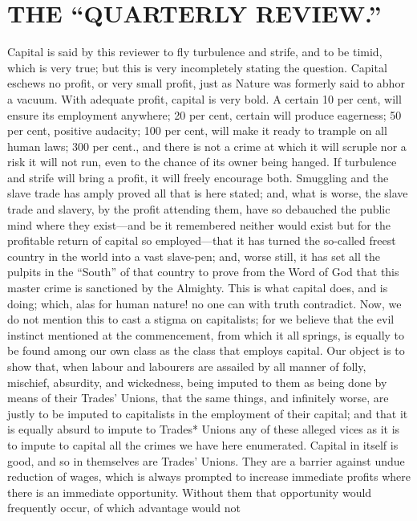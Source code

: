 \section{THE ``QUARTERLY REVIEW.''}

Capital is said by this reviewer to fly turbulence and strife, and to be
timid, which is very true; but this is very incompletely stating the
question. Capital eschews no profit, or very small profit, just as
Nature was formerly said to abhor a vacuum. With adequate profit,
capital is very bold. A certain 10 per cent, will ensure its employment
anywhere; 20 per cent, certain will produce eagerness; 50 per cent,
positive audacity; 100 per cent, will make it ready to trample on all
human laws; 300 per cent., and there is not a crime at which it will
scruple nor a risk it will not run, even to the chance of its owner
being hanged. If turbulence and strife will bring a profit, it will
freely encourage both. Smuggling and the slave trade has amply proved
all that is here stated; and, what is worse, the slave trade and
slavery, by the profit attending them, have so debauched the public mind
where they exist---and be it remembered neither would exist but for the
profitable return of capital so employed---that it has turned the
so-called freest country in the world into a vast slave-pen; and, worse
still, it has set all the pulpits in the ``South'' of that country to
prove from the Word of God that this master crime is sanctioned by the
Almighty. This is what capital does, and is doing; which, alas for human
nature! no one can with truth contradict. Now, we do not mention this to
cast a stigma on capitalists; for we believe that the evil instinct
mentioned at the commencement, from which it all springs, is equally to
be found among our own class as the class that employs capital. Our
object is to show that, when labour and labourers are assailed by all
manner of folly, mischief, absurdity, and wickedness, being imputed to
them as being done by means of their Trades' Unions, that the same
things, and infinitely worse, are justly to be imputed to capitalists in
the employment of their capital; and that it is equally absurd to impute
to Trades* Unions any of these alleged vices as it is to impute to
capital all the crimes we have here enumerated. Capital in itself is
good, and so in themselves are Trades' Unions. They are a barrier
against undue reduction of wages, which is always prompted to increase
immediate profits where there is an immediate opportunity. Without them
that opportunity would frequently occur, of which advantage would not
